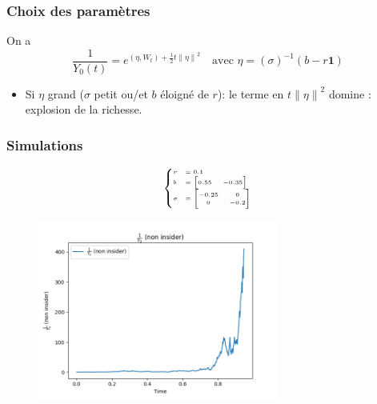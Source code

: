 \documentclass{beamer}
\begin{document}
\begin{frame}
\frametitle{Choix des paramètres}
\par On a 
\begin{displaymath}
\frac{1}{Y_0 \left( t \right)} = e^{ \left( \eta, W_{t} \right) + \frac{1}{2} t {\| \eta \|}^{2}} \quad \text{avec } \eta = (\sigma)^{-1} (b - r \textbf{1})
\end{displaymath}
\begin{itemize}
\item Si $\eta$ grand ($\sigma$ petit ou/et $b$ éloigné de $r$): le terme en $t {\| \eta \|}^{2}$ domine : explosion de la richesse.
\end{itemize}
\end{frame}


\begin{frame}
\frametitle{Simulations}
\begin{figure}[H]
\begin{minipage}{.15\textwidth}
\begin{displaymath}
\tiny
\begin{cases}
r &= 0.1 \\
b &= \begin{bmatrix}
		0.55 & -0.35
	\end{bmatrix} \\
\sigma &= \begin{bmatrix}
			-0.25 & 0 \\
			0 & -0.2
		  \end{bmatrix}
\end{cases}
\end{displaymath}
\end{minipage}%
\begin{minipage}{.85\textwidth}
  \centering
    \includegraphics[width=0.7\textwidth]{images/simulation_2/wealth_non_insider.png}
\end{minipage}
\end{figure}
\end{frame}
\end{document}
